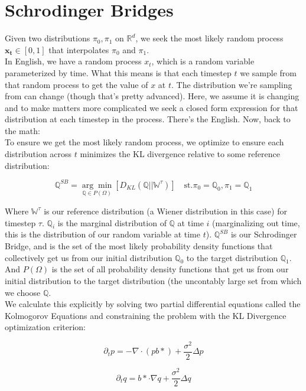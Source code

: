 \documentclass[12pt]{article}
\begin{document}
\section{Schrodinger Bridges}
Given two distributions \(\pi_0, \pi_1\) on \(\mathbb{R}^d\), we seek the most likely random process \(\mathbf{x_t} \in [0,1]\) that interpolates \(\pi_0\) and \( \pi_1\). \\

In English, we have a random process \(x_t\), which is a random variable parameterized by time. What this means is that each timestep \(t\) we sample from that random process to get the value of \(x\) at \(t\). The distribution we're sampling from can change (though that's pretty advanced). Here, we assume it is changing and to make matters more complicated we seek a closed form expression for that distribution at each timestep in the process. There's the English. Now, back to the math: \\

To ensure we get the most likely random process, we optimize to ensure each distribution across \(t\) minimizes the KL divergence relative to some reference distribution: 

\[\mathbb{Q}^{SB} = \underset{\mathbb{Q} \in P(\Omega)}{\arg\min}\left[D_{KL}(\mathbb{Q}||\mathbb{W}^{\tau})\right]\quad \text{st.} \pi_0 =\mathbb{Q}_0, \pi_1 = \mathbb{Q}_1\]

Where \(\mathbb{W}^{\tau}\) is our reference distribution (a Wiener distribution in this case) for timestep \(\tau\). \(\mathbb{Q}_i\) is the marginal distribution of \(\mathbb{Q}\) at time \(i\) (marginalizing out time, this is the distribution of our random variable at time \(t\)).   \(\mathbb{Q}^{SB}\) is our Schrodinger Bridge, and is the set of the most likely probability density functions that collectively get us from our initial distribution \(\mathbb{Q}_0\) to the target distribution \(\mathbb{Q}_1\). And \(P(\Omega)\) is the set of all probability density functions that get us from our initial distribution to the target distribution (the uncontably large set from which we choose \(\mathbb{Q}\).\\

We calculate this explicitly by solving two partial differential equations called the Kolmogorov Equations and constraining the problem with the KL Divergence optimization criterion:

\[\partial_tp = -\nabla \cdot (pb*) + \frac{\sigma^2}{2}\Delta p\]

\[\partial_tq = b* \cdot \nabla q +\frac{\sigma^2}{2}\Delta q\]
\end{document}

